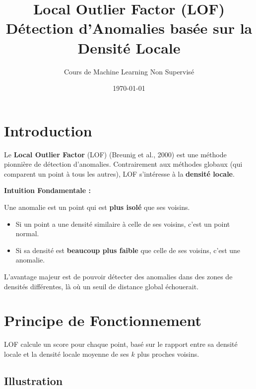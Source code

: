 \documentclass[a4paper,11pt]{article}
\title{\textbf{Local Outlier Factor (LOF)} \\ \large Détection d'Anomalies basée sur la Densité Locale}
\author{Cours de Machine Learning Non Supervisé}
\date{\today}
\begin{document}
\maketitle
\tableofcontents
\newpage

\section{Introduction}

Le \textbf{Local Outlier Factor} (LOF) (Breunig et al., 2000) est une méthode pionnière de détection d'anomalies. Contrairement aux méthodes globaux (qui comparent un point à tous les autres), LOF s'intéresse à la \textbf{densité locale}.

\begin{conceptbox}
\textbf{Intuition Fondamentale :}

Une anomalie est un point qui est \textbf{plus isolé} que ses voisins.

\begin{itemize}
    \item Si un point a une densité similaire à celle de ses voisins, c'est un point normal.
    \item Si sa densité est \textbf{beaucoup plus faible} que celle de ses voisins, c'est une anomalie.
\end{itemize}

L'avantage majeur est de pouvoir détecter des anomalies dans des zones de densités différentes, là où un seuil de distance global échouerait.
\end{conceptbox}

\section{Principe de Fonctionnement}

LOF calcule un score pour chaque point, basé sur le rapport entre sa densité locale et la densité locale moyenne de ses $k$ plus proches voisins.

\subsection{Illustration}
\end{document}

